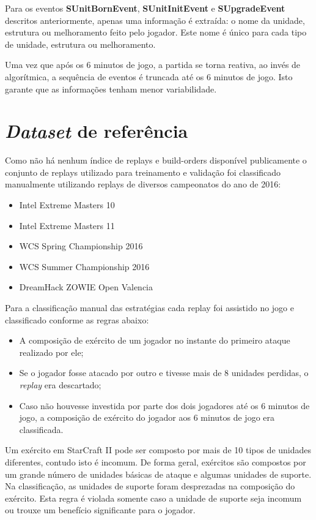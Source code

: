 Para os eventos \textbf{SUnitBornEvent}, \textbf{SUnitInitEvent} e \textbf{SUpgradeEvent} descritos anteriormente, apenas uma informação é extraída: o nome da unidade, estrutura ou melhoramento feito pelo jogador. Este nome é único para cada tipo de unidade, estrutura ou melhoramento.

Uma vez que após os 6 minutos de jogo, a partida se torna reativa, ao invés de algorítmica, a sequência de eventos é truncada até os 6 minutos de jogo. Isto garante que as informações tenham menor variabilidade. 

\section{\textit{Dataset} de referência}
Como não há nenhum índice de replays e build-orders disponível publicamente o conjunto de replays utilizado para treinamento e validação foi classificado manualmente utilizando replays de diversos campeonatos do ano de 2016:

\begin{itemize}
	\item Intel Extreme Masters 10
	\item Intel Extreme Masters 11
	\item WCS Spring Championship 2016
	\item WCS Summer Championship 2016
	\item DreamHack ZOWIE Open Valencia
\end{itemize}

Para a classificação manual das estratégias cada replay foi assistido no jogo e classificado conforme as regras abaixo:

\begin{itemize}
	\item A composição de exército de um jogador no instante do primeiro ataque realizado por ele;
	\item Se o jogador fosse atacado por outro e tivesse mais de 8 unidades perdidas, o \textit{replay} era descartado;
	\item Caso não houvesse investida por parte dos dois jogadores até os 6 minutos de jogo, a composição de exército do jogador aos 6 minutos de jogo era classificada.
\end{itemize}

Um exército em StarCraft II pode ser composto por mais de 10 tipos de unidades diferentes, contudo isto é incomum. De forma geral, exércitos são compostos por um grande número de unidades básicas de ataque e algumas unidades de suporte. Na classificação, as unidades de suporte foram desprezadas na composição do exército. Esta regra é violada somente caso a unidade de suporte seja incomum ou trouxe um benefício significante para o jogador.

